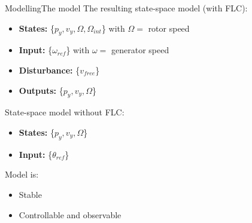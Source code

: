 
\begin{frame}{Modelling}{The model}
	The resulting state-space model (with FLC):
	\begin{itemize}
		\item \textbf{States:} \{$ p_y, v_y, \Omega, \Omega_{int} $\} \hspace{1mm} with $ \Omega =$ rotor speed
		\item \textbf{Input:} \{$ \omega_{ref} $\} \hspace{1mm} with $ \omega =$ generator speed
		\item \textbf{Disturbance:} \{$ v_{free} $\}
		\item \textbf{Outputs:} \{$ p_y, v_y, \Omega $\}
	\end{itemize}	
	
	State-space model without FLC:
	\begin{itemize}
		\item \textbf{States:} \{$ p_y, v_y, \Omega$\}
		\item \textbf{Input:} \{$ \theta_{ref} $\}
	\end{itemize}
	
	Model is:
	\begin{itemize}
		\item Stable
		\item Controllable and observable
	\end{itemize}


\end{frame}